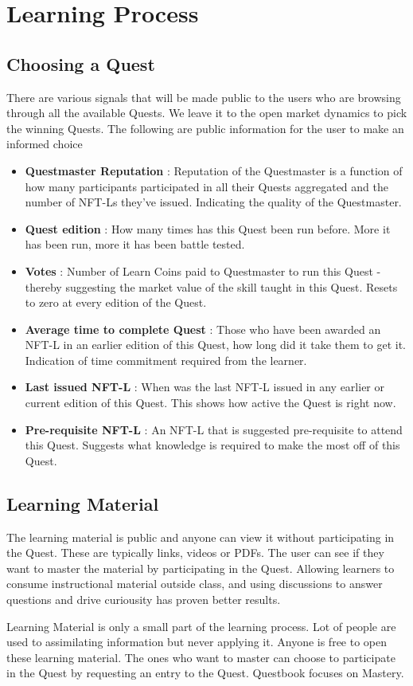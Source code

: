 \documentclass{article}
\begin{document}
  \section{Learning Process}
    \subsection{Choosing a Quest}
        There are various signals that will be made public to the users who are browsing through all the available Quests. We leave it to the open market dynamics to pick the winning Quests.
        The following are public information for the user to make an informed choice
        \begin{itemize}
          \item \textbf{Questmaster Reputation }: Reputation of the Questmaster is a function of how many participants participated in all their Quests aggregated and the number of NFT-Ls they've issued. Indicating the quality of the Questmaster.
          \item \textbf{Quest edition }: How many times has this Quest been run before. More it has been run, more it has been battle tested.
          \item \textbf{Votes }: Number of Learn Coins paid to Questmaster to run this Quest - thereby suggesting the market value of the skill taught in this Quest. Resets to zero at every edition of the Quest.
          \item \textbf{Average time to complete Quest }: Those who have been awarded an NFT-L in an earlier edition of this Quest, how long did it take them to get it. Indication of time commitment required from the learner. 
          \item \textbf{Last issued NFT-L }:  When was the last NFT-L issued in any earlier or current edition of this Quest. This shows how active the Quest is right now. 
          \item \textbf{Pre-requisite NFT-L }: An NFT-L that is suggested pre-requisite to attend this Quest. Suggests what knowledge is required to make the most off of this Quest.
        \end{itemize}
    \subsection{Learning Material}
        The learning material is public and anyone can view it without participating in the Quest. 
        These are typically links, videos or PDFs. The user can see if they want to master the material by participating in the Quest. 
        Allowing learners to consume instructional material outside class, and using discussions to answer questions and drive curiousity has proven better results. %
        \par
        Learning Material is only a small part of the learning process. Lot of people are used to assimilating information but never applying it. 
        Anyone is free to open these learning material. 
        The ones who want to master can choose to participate in the Quest by requesting an entry to the Quest.
        Questbook focuses on Mastery.
\end{document}
